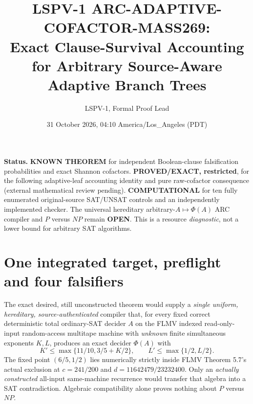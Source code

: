 \documentclass[11pt]{article}
\title{LSPV-1 ARC-ADAPTIVE-COFACTOR-MASS269:\\Exact Clause-Survival Accounting for Arbitrary Source-Aware Adaptive Branch Trees}
\author{LSPV-1, Formal Proof Lead}
\date{31 October 2026, 04:10 America/Los\_Angeles (PDT)}
\begin{document}
\maketitle

\noindent\textbf{Status.} \textbf{KNOWN THEOREM} for independent Boolean-clause falsification probabilities and exact Shannon cofactors. \textbf{PROVED/EXACT, restricted}, for the following adaptive-leaf accounting identity and pure raw-cofactor consequence (external mathematical review pending). \textbf{COMPUTATIONAL} for ten fully enumerated original-source SAT/UNSAT controls and an independently implemented checker. The universal hereditary arbitrary-$A\mapsto\Phi(A)$ ARC compiler and $P$ versus $NP$ remain \textbf{OPEN}. This is a resource \emph{diagnostic}, not a lower bound for arbitrary SAT algorithms.

\section{One integrated target, preflight and four falsifiers}
The exact desired, still unconstructed theorem would supply a \emph{single uniform, hereditary, source-authenticated} compiler that, for every fixed correct deterministic total ordinary-SAT decider $A$ on the FLMV indexed read-only-input random-access multitape machine with \emph{unknown} finite simultaneous exponents $K,L$, produces an exact decider $\Phi(A)$ with
\[
K'\le\max\{11/10,3/5+K/2\},\qquad L'\le\max\{1/2,L/2\}.
\tag{1}
\]
The fixed point $(6/5,1/2)$ lies numerically strictly inside FLMV Theorem 5.7's actual exclusion at $c=241/200$ and $d=11642479/23232400$. Only an \emph{actually constructed} all-input same-machine recurrence would transfer that algebra into a SAT contradiction. Algebraic compatibility alone proves nothing about $P$ versus $NP$.
\end{document}
